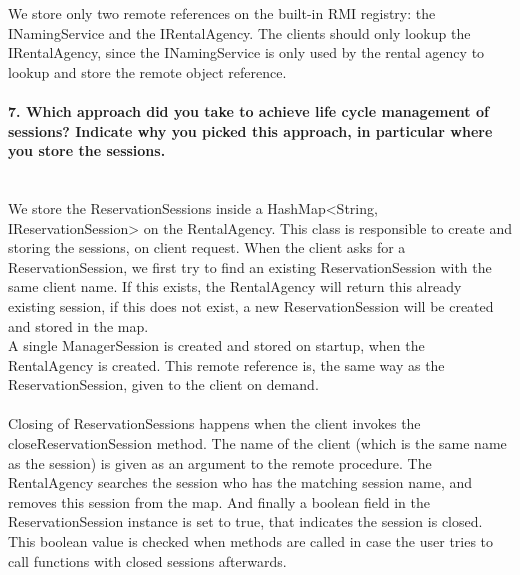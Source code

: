 \documentclass{ds-report}
\begin{document}
We store only two remote references on the built-in RMI registry: the INamingService and the IRentalAgency. The clients should only lookup the IRentalAgency, since the INamingService is only used by the rental agency to lookup and store the remote object reference.

	\paragraph{7. Which approach did you take to achieve life cycle management of sessions? Indicate why you
picked this approach, in particular where you store the sessions.} \mbox{}\\
We store the ReservationSessions inside a HashMap<String, IReservationSession> on the RentalAgency. This class is responsible to create and storing the sessions, on client request. When the client asks for a ReservationSession, we first try to find an existing ReservationSession with the same client name. If this exists, the RentalAgency will return this already existing session, if this does not exist, a new ReservationSession will be created and stored in the map.\\
A single ManagerSession is created and stored on startup, when the RentalAgency is created. This remote reference is, the same way as the ReservationSession, given to the client on demand.\\
\mbox{}\\
Closing of ReservationSessions happens when the client invokes the closeReservationSession method. The name of the client (which is the same name as the session) is given as an argument to the remote procedure. The RentalAgency searches the session who has the matching session name, and removes this session from the map. And finally a boolean field in the ReservationSession instance is set to true, that indicates the session is closed. This boolean value is checked when methods are called in case the user tries to call functions with closed sessions afterwards.
\end{document}
